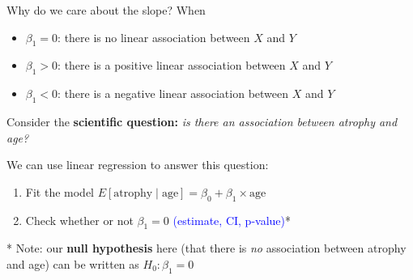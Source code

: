 \documentclass[10pt,t]{beamer}
\begin{document}
\begin{frame}{Why do we care about the slope?}
When
\begin{itemize}
	\item $\beta_1 = 0$: there is no linear association between $X$ and $Y$
	\item $\beta_1 > 0$: there is a positive linear association between $X$ and $Y$
	\item $\beta_1 < 0$: there is a negative linear association between $X$ and $Y$ \pause
\end{itemize}

\vspace{0.3cm}

Consider the \textbf{scientific question:} \textit{is there an association between atrophy and age?}

\vspace{0.3cm}

We can use linear regression to answer this question:

\begin{enumerate}
	\item Fit the model $E[\text{atrophy} \mid \text{age}] = \beta_0 + \beta_1 \times \text{age}$
	\item Check whether or not $\beta_1 = 0$ \textcolor{blue}{(estimate, CI, p-value)}*
\end{enumerate}

\vspace{0.3cm}

* Note: our \textbf{null hypothesis} here (that there is \textit{no} association between atrophy and age) can be written as $H_0: \beta_1 = 0$

\end{frame}
\end{document}

